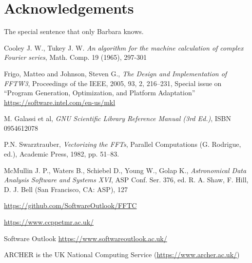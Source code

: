 \documentclass[12pt, a4paper]{article} \setlength{\textheight}{24cm}
\begin{document}
\section{Acknowledgements}
The special sentence that only Barbara knows.
\begin{thebibliography}{9}

 Cooley J. W., Tukey J. W.  {\it An algorithm for the
    machine calculation of complex Fourier series}, Math. Comp. 19
  (1965), 297-301
 
 Frigo, Matteo and Johnson, Steven G., {\it The Design
    and Implementation of FFTW3}, Proceedings of the IEEE, 2005, 93,
  2, 216--231, Special issue on ``Program Generation, Optimization,
  and Platform Adaptation''
 \url{https://software.intel.com/en-us/mkl}

 M. Galassi et al, {\it GNU Scientific Library Reference
    Manual (3rd Ed.)}, ISBN 0954612078
  
 P.N. Swarztrauber, {\it Vectorizing the FFTs},
  Parallel Computations (G. Rodrigue, ed.), Academic Press, 1982, pp.
  51--83.
  
 McMullin J. P., Waters B., Schiebel D., Young W., Golap
  K., {\it Astronomical Data Analysis Software and Systems XVI}, ASP
  Conf. Ser. 376, ed. R. A. Shaw, F. Hill, D. J. Bell (San Francisco,
  CA: ASP), 127

 \url{https://github.com/SoftwareOutlook/FFTC}
    
 \url{https://www.ccppetmr.ac.uk/}

 Software Outlook
  \url{https://www.softwareoutlook.ac.uk/}

 ARCHER is the UK National Computing Service
  (\url{https://www.archer.ac.uk/})
  
\end{thebibliography}
\end{document}

